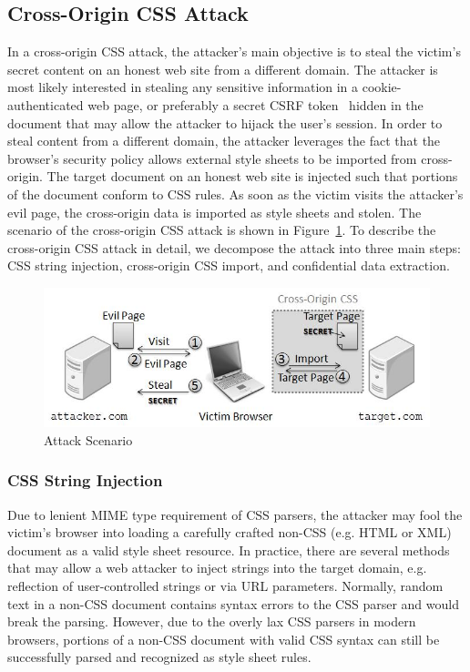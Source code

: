 \documentclass{acm_proc_article-sp}
\begin{document}
\subsection{Cross-Origin CSS Attack}
In a cross-origin CSS attack, the attacker's main objective is to steal the victim's secret content on an honest web site from a different domain. The attacker is most likely interested in stealing any sensitive information in a cookie-authenticated web page, or preferably a secret CSRF token~\cite{csrf} hidden in the document that may allow the attacker to hijack the user's session. In order to steal content from a different domain, the attacker leverages the fact that the browser's security policy allows external style sheets to be imported from cross-origin. The target document on an honest web site is injected such that portions of the document conform to CSS rules. As soon as the victim visits the attacker's evil page, the cross-origin data is imported as style sheets and stolen. The scenario of the cross-origin CSS attack is shown in Figure~\ref{figure:scenario}. To describe the cross-origin CSS attack in detail, we decompose the attack into three main steps: CSS string injection, cross-origin CSS import, and confidential data extraction.

\begin{figure}
\centering
\includegraphics[width=\linewidth]{scenario.jpg}
\caption{Attack Scenario}
\label{figure:scenario}
\end{figure}

\subsubsection{CSS String Injection}
Due to lenient MIME type requirement of CSS parsers, the attacker may fool the victim's browser into loading a carefully crafted non-CSS (e.g. HTML or XML) document as a valid style sheet resource. In practice, there are several methods that may allow a web attacker to inject strings into the target domain, e.g. reflection of user-controlled strings or via URL parameters. Normally, random text in a non-CSS document contains syntax errors to the CSS parser and would break the parsing. However, due to the overly lax CSS parsers in modern browsers, portions of a non-CSS document with valid CSS syntax can still be successfully parsed and recognized as style sheet rules.
\end{document}
